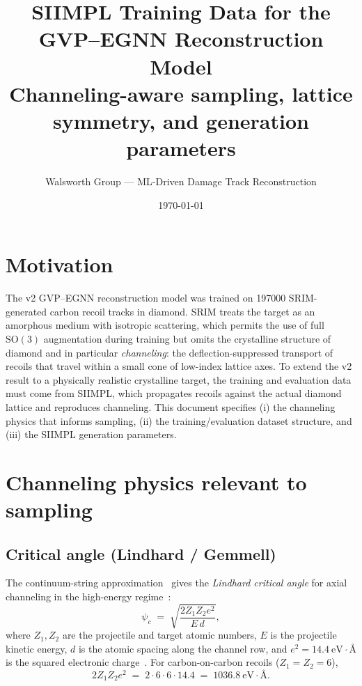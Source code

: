\documentclass[11pt]{article}
\title{SIIMPL Training Data for the GVP--EGNN Reconstruction Model\\
\large Channeling-aware sampling, lattice symmetry, and generation parameters}
\author{Walsworth Group --- ML-Driven Damage Track Reconstruction}
\date{\today}
\begin{document}
\maketitle

\section{Motivation}

The v2 GVP--EGNN reconstruction model was trained on \num{197000} SRIM-generated
carbon recoil tracks in diamond. SRIM treats the target as an amorphous medium
with isotropic scattering, which permits the use of full $\mathrm{SO}(3)$
augmentation during training but omits the crystalline structure of diamond and
in particular \emph{channeling}: the deflection-suppressed transport of recoils
that travel within a small cone of low-index lattice axes. To extend the v2
result to a physically realistic crystalline target, the training and evaluation
data must come from SIIMPL, which propagates recoils against the actual diamond
lattice and reproduces channeling. This document specifies (i) the channeling
physics that informs sampling, (ii) the training/evaluation dataset structure,
and (iii) the SIIMPL generation parameters.

\section{Channeling physics relevant to sampling}

\subsection{Critical angle (Lindhard / Gemmell)}

The continuum-string approximation~\cite{Lindhard1965} gives the
\emph{Lindhard critical angle} for axial channeling in the high-energy
regime~\cite[Eq.~(2.12)]{Gemmell1974}:
\begin{equation}
  \psi_c \;=\; \sqrt{\frac{2 Z_1 Z_2 e^2}{E\,d}},
  \label{eq:psi_c}
\end{equation}
where $Z_1, Z_2$ are the projectile and target atomic numbers, $E$ is the
projectile kinetic energy, $d$ is the atomic spacing along the channel row, and
$e^2 = 14.4~\mathrm{eV\cdot\text{\AA}}$ is the squared electronic
charge~\cite[Glossary]{Gemmell1974}. For carbon-on-carbon recoils
($Z_1 = Z_2 = 6$),
\begin{equation}
  2 Z_1 Z_2 e^2 \;=\; 2 \cdot 6 \cdot 6 \cdot 14.4 \;=\; 1036.8~\mathrm{eV\cdot\text{\AA}}.
\end{equation}
\end{document}
